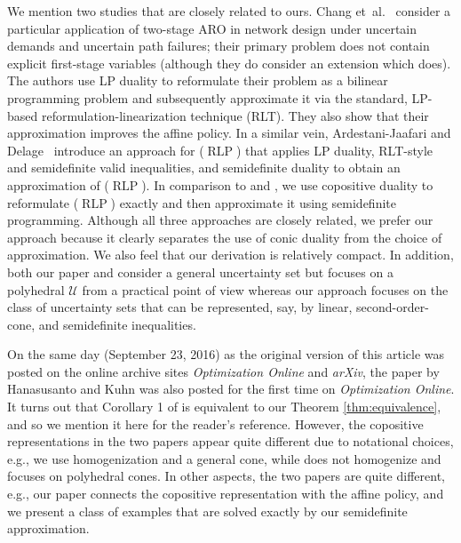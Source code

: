 \documentclass[12pt]{article}
\DeclareMathOperator{\AR}{RLP}
\newcommand{\U}{{\mathcal{U}}}
\begin{document}
\begin{onehalfspace}
We mention two studies that are closely related to ours. Chang
et~al.~\cite{Chang.Rao.Tawarmalani.2017} consider a particular
application of two-stage ARO in network design under uncertain
demands and uncertain path failures; their primary problem does not
contain explicit first-stage variables (although they do consider
an extension which does). The authors use LP duality to reformulate
their problem as a bilinear programming problem and subsequently
approximate it via the standard, LP-based reformulation-linearization
technique (RLT). They also show that their approximation improves
the affine policy. In a similar vein, Ardestani-Jaafari and
Delage~\cite{Ardestani-Jaafari.Delage.2016} introduce an approach for
($\AR$) that applies LP duality, RLT-style and semidefinite valid
inequalities, and semidefinite duality to obtain an approximation
of ($\AR$). In comparison to \cite{Chang.Rao.Tawarmalani.2017} and
\cite{Ardestani-Jaafari.Delage.2014}, we use copositive duality to
reformulate ($\AR$) exactly and then approximate it using semidefinite
programming. Although all three approaches are closely related, we
prefer our approach because it clearly separates the use of conic
duality from the choice of approximation. We also feel that our
derivation is relatively compact. In addition, both our paper and
\cite{Ardestani-Jaafari.Delage.2016} consider a general uncertainty
set but \cite{Ardestani-Jaafari.Delage.2016} focuses on a polyhedral
$\U$ from a practical point of view whereas our approach focuses on
the class of uncertainty sets that can be represented, say, by linear,
second-order-cone, and semidefinite inequalities.


On the same day (September 23, 2016) as the original version of this
article was posted on the online archive sites {\em Optimization
Online\/} and {\em arXiv\/}, the paper \cite{Hanasusanto.Kuhn.2016}
by Hanasusanto and Kuhn was also posted for the first time on
{\em Optimization Online\/}. It turns out that Corollary 1
of \cite{Hanasusanto.Kuhn.2016} is equivalent to our Theorem
\ref{thm:equivalence}, and so we mention it here for the reader's
reference. However, the copositive representations in the two papers
appear quite different due to notational choices, e.g., we use
homogenization and a general cone, while \cite{Hanasusanto.Kuhn.2016}
does not homogenize and focuses on polyhedral cones. In other aspects,
the two papers are quite different, e.g., our paper connects the
copositive representation with the affine policy, and we present a class
of examples that are solved exactly by our semidefinite approximation.


\end{onehalfspace}
\end{document}

